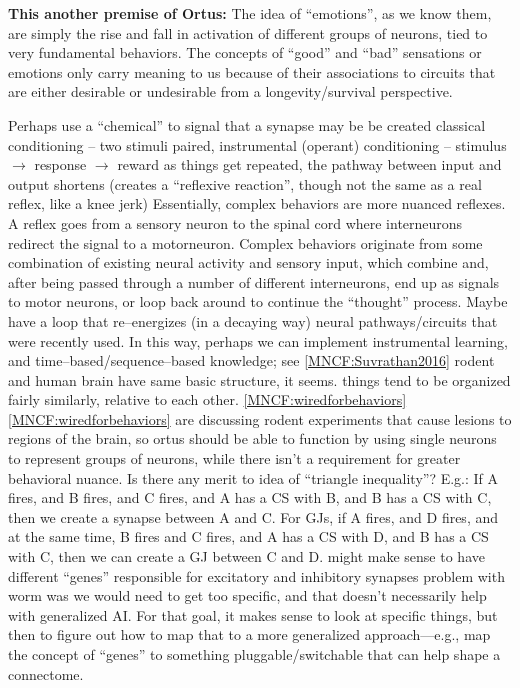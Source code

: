 \documentclass[11pt, a4paper, oneside]{article}   	%
\begin{document}
\textbf{This another premise of Ortus:} The idea of ``emotions'', as we know them, are simply the rise and fall in activation of different groups of neurons, tied to very fundamental behaviors. The concepts of ``good'' and ``bad'' sensations or emotions only carry meaning to us because of their associations to circuits that are either desirable or undesirable from a longevity/survival perspective.


\begin{outline}
\point Perhaps use a ``chemical'' to signal that a synapse may be be created
\point classical conditioning -- two stimuli paired, instrumental (operant) conditioning -- stimulus $\rightarrow$ response $\rightarrow$ reward
\point as things get repeated, the pathway between input and output shortens (creates a ``reflexive reaction'', though not the same as a real reflex, like a knee jerk)
  \subpoint Essentially, complex behaviors are more nuanced reflexes. A reflex goes from a sensory neuron to the spinal cord where interneurons redirect the signal to a motorneuron. Complex behaviors originate from some combination of existing neural activity and sensory input, which combine and, after being passed through a number of different interneurons, end up as signals to motor neurons, or loop back around to continue the ``thought'' process.
  \point Maybe have a loop that re--energizes (in a decaying way) neural pathways/circuits that were recently used. In this way, perhaps we can implement instrumental learning, and time--based/sequence--based knowledge; see \ref{MNCF:Suvrathan2016}
\point rodent and human brain have same basic structure, it seems. things tend to be organized fairly similarly, relative to each other. \ref{MNCF:wiredforbehaviors}
\point \ref{MNCF:wiredforbehaviors} are discussing rodent experiments that cause lesions to regions of the brain, so ortus should be able to function by using single neurons to represent groups of neurons, while there isn't a requirement for greater behavioral nuance.
\point Is there any merit to idea of  ``triangle inequality''? E.g.:
    \subpoint If A fires, and B fires, and C fires, and A has a CS with B, and B has a CS with C, then we create a synapse between A and C.
    \subpoint For GJs, if A fires, and D fires, and at the same time, B fires and C fires, and A has a CS with D, and B has a CS with C, then we can create a GJ between C and D.
\point might make sense to have different ``genes'' responsible for excitatory and inhibitory synapses
\point problem with worm was we would need to get too specific, and that doesn't necessarily help with generalized AI. For that goal, it makes sense to look at specific things, but then to figure out how to map that to a more generalized approach---e.g., map the concept of ``genes'' to something pluggable/switchable that can help shape a connectome.

\end{outline}
\end{document}
